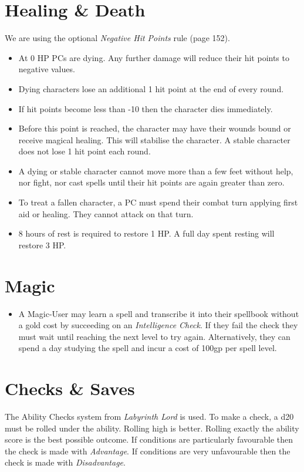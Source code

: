 \section{Healing \& Death}
We are using the optional \emph{Negative Hit Points} rule (page 152).
\begin{itemize}
      \item At 0 HP PCs are dying. Any further damage will reduce their hit
      points to negative values.
      \item Dying characters lose an additional 1 hit point at the end of every
      round.
      \item If hit points become less than -10 then the character dies immediately.
      \item Before this point is reached, the character may have their wounds
      bound or receive magical healing. This will stabilise the character. A
      stable character does not lose 1 hit point each round.
      \item A dying or stable character cannot move more than a few feet without
      help, nor fight, nor cast spells until their hit points are again greater
      than zero.
      \item To treat a fallen character, a PC must spend their combat turn
            applying first aid or healing. They cannot attack on that turn.
      \item 8 hours of rest is required to restore 1 HP\@. A full day spent
            resting will restore 3 HP\@.
\end{itemize}

\section{Magic}
\begin{itemize}
    \item A Magic-User may learn a spell and transcribe it into their spellbook
    without a gold cost by succeeding on an \emph{Intelligence Check}. If they
    fail the check they must wait until reaching the next level to try again.
    Alternatively, they can spend a day studying the spell and incur a cost of
    100gp per spell level.
\end{itemize}

\section{Checks \& Saves}
The Ability Checks system from \emph{Labyrinth Lord} is used. To make a check, a
d20 must be rolled under the ability. Rolling high is better. Rolling exactly
the ability score is the best possible outcome. If conditions are particularly
favourable then the check is made with \emph{Advantage}. If conditions are very
unfavourable then the check is made with \emph{Disadvantage}.


